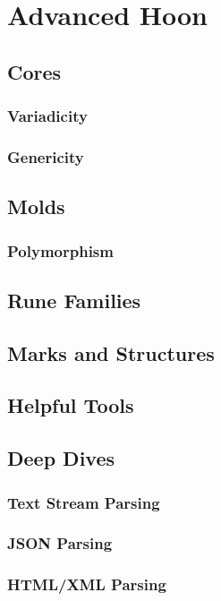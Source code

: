\setchapterpreamble[u]{\margintoc}
\chapter{Advanced Hoon}


\section{Cores}

\subsection{Variadicity}

\subsection{Genericity}

\section{Molds}

\subsection{Polymorphism}

\section{Rune Families}

\section{Marks and Structures}

\section{Helpful Tools}

\section{Deep Dives}

\subsection{Text Stream Parsing}

\subsection{JSON Parsing}

\subsection{HTML/XML Parsing}
